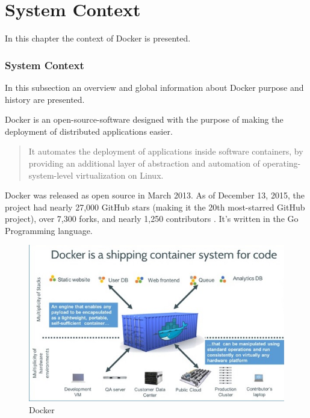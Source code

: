 \chapter{System Context}
\label{ch:context}

In this chapter the context of Docker is presented.%

\subsection{System Context}
In this subsection an overview and global information about Docker purpose and history are presented. %

Docker is an open-source-software designed with the purpose of making the deployment of distributed applications easier.
\begin{quote}
It automates the deployment of applications inside software containers, by providing an additional layer of abstraction and automation of operating-system-level virtualization on Linux. %
\end{quote}
Docker was released as open source in March 2013. As of December 13, 2015, the project had nearly 27,000 GitHub stars (making it the 20th most-starred GitHub project), over 7,300 forks, and nearly 1,250 contributors \cite{dockerrepo}.
It's written in the Go Programming language. \\


\begin{figure}[H]
\centering
\includegraphics[scale=0.8]{images/docker_container.jpeg}
\caption{Docker}
\label{fig:analysis-mvc}
\end{figure}

